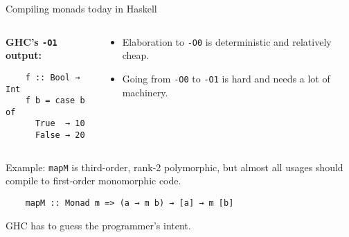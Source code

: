 \documentclass[dvipsnames,aspectratio=169]{beamer}
\newcommand{\ttt}[1]{{\texttt{#1}}}
\theoremstyle{remark}
\begin{document}
\begin{frame}[fragile]{Compiling monads today in Haskell}

\begin{columns}
\begin{column}{0.3\textwidth}
\textbf{GHC's \texttt{-O1} output:}
\begin{verbatim}
    f :: Bool → Int
    f b = case b of
      True  → 10
      False → 20
\end{verbatim}

\end{column}
\begin{column}{0.6\textwidth}
\begin{itemize}
  \item Elaboration to \texttt{-O0} is deterministic and relatively cheap.
  \item Going from \texttt{-O0} to \texttt{-O1} is \alert{hard} and needs
        a lot of machinery.
\end{itemize}
\end{column}
\end{columns}
\vspace{2em}

Example: \ttt{mapM} is third-order, rank-2 polymorphic, but almost all usages should
compile to first-order monomorphic code.
\begin{verbatim}
    mapM :: Monad m => (a → m b) → [a] → m [b]
\end{verbatim}

GHC has to guess the programmer's intent.
\vspace{1em}

\end{frame}
\end{document}
